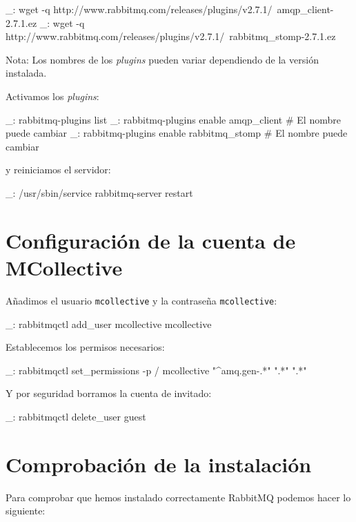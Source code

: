 \begin{bashcode}
_: wget -q http://www.rabbitmq.com/releases/plugins/v2.7.1/\
amqp_client-2.7.1.ez
_: wget -q http://www.rabbitmq.com/releases/plugins/v2.7.1/\
rabbitmq_stomp-2.7.1.ez
\end{bashcode}

Nota: Los nombres de los \emph{plugins} pueden variar dependiendo de la versión instalada.

Activamos los \emph{plugins}:

\begin{bashcode}
_: rabbitmq-plugins list
_: rabbitmq-plugins enable amqp_client           # El nombre puede cambiar
_: rabbitmq-plugins enable rabbitmq_stomp        # El nombre puede cambiar
\end{bashcode}

y reiniciamos el servidor:

\begin{bashcode}
_: /usr/sbin/service rabbitmq-server restart
\end{bashcode}


\section{Configuración de la cuenta de MCollective}

Añadimos el usuario \texttt{mcollective} y la contraseña \texttt{mcollective}:
\begin{bashcode}
_: rabbitmqctl add_user mcollective mcollective
\end{bashcode}

Establecemos los permisos necesarios:

\begin{bashcode}
_: rabbitmqctl set_permissions -p / mcollective "^amq.gen-.*" ".*" ".*"
\end{bashcode}

Y por seguridad borramos la cuenta de invitado:

\begin{bashcode}
_: rabbitmqctl delete_user guest
\end{bashcode}


\section{Comprobación de la instalación}

Para comprobar que hemos instalado correctamente RabbitMQ podemos hacer lo siguiente:

